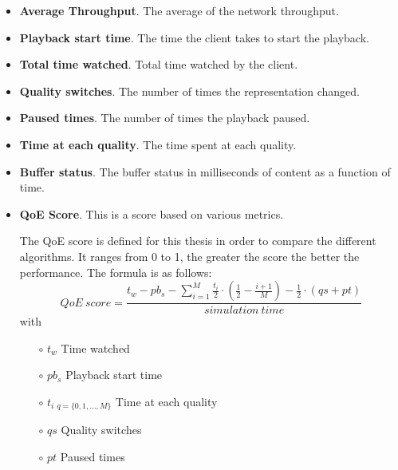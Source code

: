 \begin{itemize}[topsep=0pt, noitemsep]
    \item \textbf{Average Throughput}. The average of the network throughput.
    \item \textbf{Playback start time}. The time the client takes to start the playback.
    \item \textbf{Total time watched}. Total time watched by the client.
    \item \textbf{Quality switches}. The number of times the representation changed.
    \item \textbf{Paused times}. The number of times the playback paused.
    \item \textbf{Time at each quality}. The time spent at each quality.
    \item \textbf{Buffer status}. The buffer status in milliseconds of content as a function of time.
    \item \textbf{QoE Score}. This is a score based on various metrics.
    
    The QoE score is defined for this thesis in order to compare the different algorithms. It 
    ranges from 0 to 1, the greater the score the better the performance. The formula is as follows:
    \begin{equation}
        QoE\ score = \frac{t_w-pb_s-\sum_{i=1}^{M} \frac{t_i}{2}\cdot (\frac{1}{2}-\frac{i+1}{M})-\frac{1}{2}\cdot (qs+pt)}{simulation\ time}
    \end{equation}
    with
    \begin{itemize}[topsep=0pt, noitemsep]
        \item[$\circ$] $t_w$ 		                            Time watched
        \item[$\circ$] $pb_s$ 		                            Playback start time
        \item[$\circ$] $t_i\ _{q=\{0,1,...,M\}}$ 		        Time at each quality 
        \item[$\circ$] $qs$ 		                            Quality switches
        \item[$\circ$] $pt$ 		                            Paused times
    \end{itemize}

\end{itemize}



